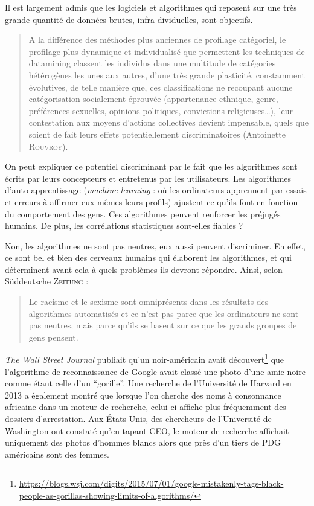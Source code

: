 \documentclass[a4paper,12pt]{report}
\begin{document}
Il est largement admis que les logiciels et algorithmes qui reposent sur une très grande quantité de données brutes, infra-dividuelles, sont objectifs. 

\begin{quotation}
A la différence des méthodes plus anciennes de profilage catégoriel, le profilage plus dynamique et individualisé que permettent les techniques de datamining classent les individus dans une multitude de catégories hétérogènes les unes aux autres, d'une très grande plasticité, constamment évolutives, de telle manière que, ces classifications ne recoupant aucune catégorisation socialement éprouvée (appartenance ethnique, genre, préférences sexuelles, opinions politiques, convictions religieuses…), leur contestation aux moyens d'actions collectives devient impensable, quels que soient de fait leurs effets potentiellement discriminatoires (Antoinette \textsc{Rouvroy}).
\end{quotation}

On peut expliquer ce potentiel discriminant par le fait que les algorithmes sont écrits par leurs concepteurs et entretenus par les utilisateurs. Les algorithmes d'auto apprentissage (\textit{machine learning} : où les ordinateurs apprennent par essais et erreurs à affirmer eux-mêmes leurs profils) ajustent ce qu'ils font en fonction du comportement des gens. Ces algorithmes peuvent renforcer les préjugés humains. De plus, les corrélations statistiques sont-elles fiables ?

Non, les algorithmes ne sont pas neutres, eux aussi peuvent discriminer. En effet, ce sont bel et bien des cerveaux humains qui élaborent les algorithmes, et qui déterminent avant cela à quels problèmes ils devront répondre. Ainsi, selon Süddeutsche  \textsc{Zeitung} : \begin{quote} Le racisme et le sexisme sont omniprésents dans les résultats des algorithmes automatisés et ce n'est pas parce que les ordinateurs ne sont pas neutres, mais parce qu'ils se basent sur ce que les grands groupes de gens pensent.\end{quote}

\textit{The Wall Street Journal} publiait qu'un noir-américain avait découvert\footnote{\url{https://blogs.wsj.com/digits/2015/07/01/google-mistakenly-tags-black-people-as-gorillas-showing-limits-of-algorithms/}} que l'algorithme de reconnaissance de Google avait classé une photo d'une amie noire comme étant celle d'un ``gorille''.
Une recherche de l'Université de Harvard en 2013 a également montré que lorsque l'on cherche des noms à consonnance africaine dans un moteur de recherche, celui-ci affiche plus fréquemment des dossiers d'arrestation. Aux États-Unis, des chercheurs de l'Université de Washington ont constaté qu'en tapant CEO, le moteur de recherche affichait uniquement des photos d'hommes blancs alors que près d'un tiers de PDG américains sont des femmes.
\end{document}
